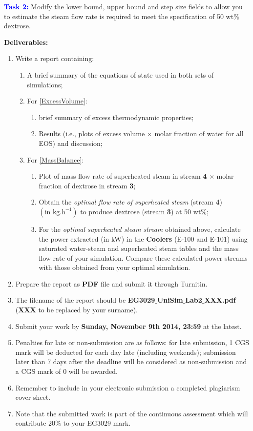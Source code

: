 \documentclass[12pts,a4paper,amsmath,amssymb,floatfix]{article}%
\begin{document}
\begin{enumerate}[label=\bfseries Problem \arabic*]
{\bf \textcolor{blue}{Task 2:}} Modify the lower bound, upper bound and step size fields to allow you to estimate the steam flow rate is required to meet the specification of 50 wt$\%$ dextrose.
%
\end{enumerate}
\clearpage

{\bf {\large Deliverables:}}
\begin{enumerate}
%
\item Write a report containing:
\begin{enumerate}
\item A brief summary of the equations of state used in both sets of simulations;
\item For \ref{ExcessVolume}: 
\begin{enumerate}
\item brief summary of excess thermodynamic properties;
\item Results (i.e., plots of excess volume $\times$ molar fraction of water for all EOS) and discussion;
\end{enumerate}
\item For \ref{MassBalance}: 
\begin{enumerate}
\item Plot of mass flow rate of superheated steam in stream {\bf 4} $\times$ molar fraction of dextrose in stream {\bf 3};
\item\label{optimal} Obtain the {\it optimal flow rate of superheated steam} (stream {\bf 4}) $\left(\text{in kg.h}^{-1}\right)$ to produce dextrose (stream {\bf 3}) at 50 wt$\%$;
\item For the {\it optimal superheated steam stream} obtained above, calculate the power extracted (in kW) in the {\bf Coolers} (E-100 and E-101) using saturated water-steam and superheated steam tables and the mass flow rate of your simulation. Compare these calculated power streams with those obtained from your optimal simulation. 
\end{enumerate}
\end{enumerate}
%
\item Prepare the report as {\bf PDF} file and submit it through Turnitin.  
%
\item The filename of the report should be {\bf EG3029$\_$UniSim$\_$Lab2$\_$XXX.pdf} ({\bf XXX} to be replaced by your surname). 
%
\item Submit your work by {\bf Sunday, November 9th 2014, 23:59} at the latest. 
%
\item Penalties for late or non-submission are as follows: for late submission, 1 CGS mark will be deducted for each day late (including weekends); submission later than 7 days after the deadline will be considered as non-submission and a CGS mark of 0 will be awarded. 
%
\item Remember to include in your electronic submission a completed plagiarism cover sheet. 
%
\item Note that the submitted work is part of the continuous assessment which will contribute 20$\%$ to your EG3029 mark.
%
\end{enumerate}



\clearpage

%
\end{document}
